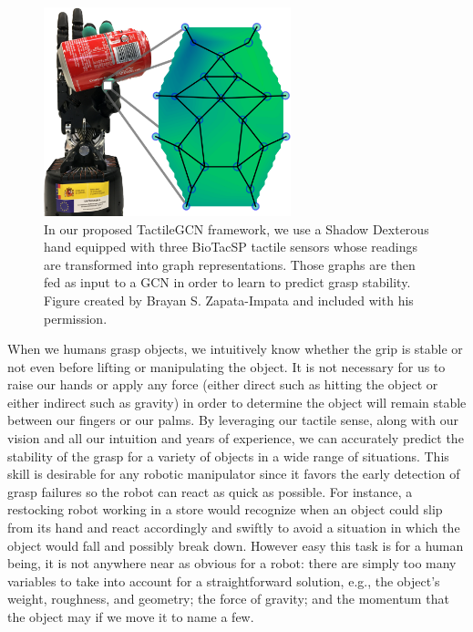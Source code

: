 \begin{figure}[!b]
	\centering
	\includegraphics[width = 0.64\textwidth, clip = false, trim = 0 0 0 0]{Figures/Tactile/hand-coke.png}
	\caption{In our proposed TactileGCN framework, we use a Shadow Dexterous hand equipped with three BioTacSP tactile sensors whose readings are transformed into graph representations. Those graphs are then fed as input to a \ac{GCN} in order to learn to predict grasp stability. Figure created by Brayan S. Zapata-Impata and included with his permission.}
	\label{fig:shadow-coke}
\end{figure}

When we humans grasp objects, we intuitively know whether the grip is stable or not even before lifting or manipulating the object. It is not necessary for us to raise our hands or apply any force (either direct such as hitting the object or either indirect such as gravity) in order to determine the object will remain stable between our fingers or our palms. By leveraging our tactile sense, along with our vision and all our intuition and years of experience, we can accurately predict the stability of the grasp for a variety of objects in a wide range of situations. This skill is desirable for any robotic manipulator since it favors the early detection of grasp failures so the robot can react as quick as possible. For instance, a restocking robot working in a store would recognize when an object could slip from its hand and react accordingly and swiftly to avoid a situation in which the object would fall and possibly break down. However easy this task is for a human being, it is not anywhere near as obvious for a robot: there are simply too many variables to take into account for a straightforward solution, e.g., the object's weight, roughness, and geometry; the force of gravity; and the momentum that the object may if we move it to name a few.


